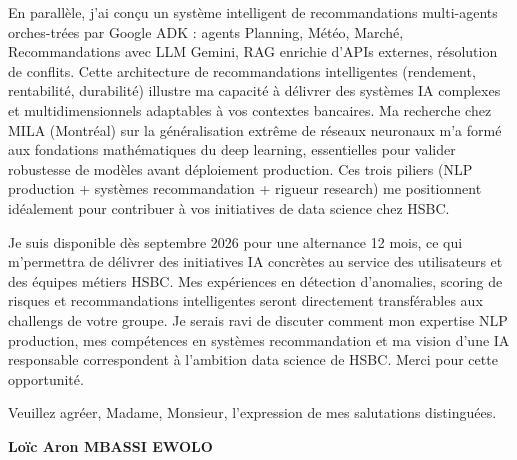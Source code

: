 \documentclass[a4paper,11pt]{article}
\begin{document}
\vspace{0.8em}
\noindent En parallèle, j'ai conçu un système intelligent de recommandations multi-agents orches-trées par Google ADK : agents Planning, Météo, Marché, Recommandations avec LLM Gemini, RAG enrichie d'APIs externes, résolution de conflits. Cette architecture de recommandations intelligentes (rendement, rentabilité, durabilité) illustre ma capacité à délivrer des systèmes IA complexes et multidimensionnels adaptables à vos contextes bancaires. Ma recherche chez MILA (Montréal) sur la généralisation extrême de réseaux neuronaux m'a formé aux fondations mathématiques du deep learning, essentielles pour valider robustesse de modèles avant déploiement production. Ces trois piliers (NLP production + systèmes recommandation + rigueur research) me positionnent idéalement pour contribuer à vos initiatives de data science chez HSBC.

\vspace{0.8em}
\noindent Je suis disponible dès septembre 2026 pour une alternance 12 mois, ce qui m'permettra de délivrer des initiatives IA concrètes au service des utilisateurs et des équipes métiers HSBC. Mes expériences en détection d'anomalies, scoring de risques et recommandations intelligentes seront directement transférables aux challengs de votre groupe. Je serais ravi de discuter comment mon expertise NLP production, mes compétences en systèmes recommandation et ma vision d'une IA responsable correspondent à l'ambition data science de HSBC. Merci pour cette opportunité.

\vspace{1.5em}
\noindent Veuillez agr\'eer, Madame, Monsieur, l'expression de mes salutations distingu\'ees.

\vspace{2em}
\noindent \textbf{Lo\"ic Aron MBASSI EWOLO}
\end{document}
